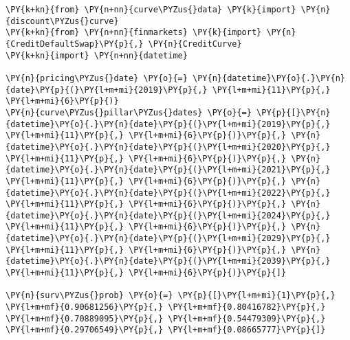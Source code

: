 \begin{Answer}
     \begin{tcolorbox}[breakable, size=fbox, boxrule=1pt, pad at break*=1mm,colback=cellbackground, colframe=cellborder]
\begin{Verbatim}[commandchars=\\\{\}]
\PY{k+kn}{from} \PY{n+nn}{curve\PYZus{}data} \PY{k}{import} \PY{n}{discount\PYZus{}curve}
\PY{k+kn}{from} \PY{n+nn}{finmarkets} \PY{k}{import} \PY{n}{CreditDefaultSwap}\PY{p}{,} \PY{n}{CreditCurve}
\PY{k+kn}{import} \PY{n+nn}{datetime}

\PY{n}{pricing\PYZus{}date} \PY{o}{=} \PY{n}{datetime}\PY{o}{.}\PY{n}{date}\PY{p}{(}\PY{l+m+mi}{2019}\PY{p}{,} \PY{l+m+mi}{11}\PY{p}{,} \PY{l+m+mi}{6}\PY{p}{)}
\PY{n}{curve\PYZus{}pillar\PYZus{}dates} \PY{o}{=} \PY{p}{[}\PY{n}{datetime}\PY{o}{.}\PY{n}{date}\PY{p}{(}\PY{l+m+mi}{2019}\PY{p}{,} \PY{l+m+mi}{11}\PY{p}{,} \PY{l+m+mi}{6}\PY{p}{)}\PY{p}{,} \PY{n}{datetime}\PY{o}{.}\PY{n}{date}\PY{p}{(}\PY{l+m+mi}{2020}\PY{p}{,} \PY{l+m+mi}{11}\PY{p}{,} \PY{l+m+mi}{6}\PY{p}{)}\PY{p}{,} \PY{n}{datetime}\PY{o}{.}\PY{n}{date}\PY{p}{(}\PY{l+m+mi}{2021}\PY{p}{,} \PY{l+m+mi}{11}\PY{p}{,} \PY{l+m+mi}{6}\PY{p}{)}\PY{p}{,} \PY{n}{datetime}\PY{o}{.}\PY{n}{date}\PY{p}{(}\PY{l+m+mi}{2022}\PY{p}{,} \PY{l+m+mi}{11}\PY{p}{,} \PY{l+m+mi}{6}\PY{p}{)}\PY{p}{,} \PY{n}{datetime}\PY{o}{.}\PY{n}{date}\PY{p}{(}\PY{l+m+mi}{2024}\PY{p}{,} \PY{l+m+mi}{11}\PY{p}{,} \PY{l+m+mi}{6}\PY{p}{)}\PY{p}{,} \PY{n}{datetime}\PY{o}{.}\PY{n}{date}\PY{p}{(}\PY{l+m+mi}{2029}\PY{p}{,} \PY{l+m+mi}{11}\PY{p}{,} \PY{l+m+mi}{6}\PY{p}{)}\PY{p}{,} \PY{n}{datetime}\PY{o}{.}\PY{n}{date}\PY{p}{(}\PY{l+m+mi}{2039}\PY{p}{,} \PY{l+m+mi}{11}\PY{p}{,} \PY{l+m+mi}{6}\PY{p}{)}\PY{p}{]}

\PY{n}{surv\PYZus{}prob} \PY{o}{=} \PY{p}{[}\PY{l+m+mi}{1}\PY{p}{,} \PY{l+m+mf}{0.90681256}\PY{p}{,} \PY{l+m+mf}{0.80416782}\PY{p}{,} \PY{l+m+mf}{0.70889095}\PY{p}{,} \PY{l+m+mf}{0.54479309}\PY{p}{,} \PY{l+m+mf}{0.29706549}\PY{p}{,} \PY{l+m+mf}{0.08665777}\PY{p}{]}


\end{Verbatim}
\end{tcolorbox}
\end{Answer}
